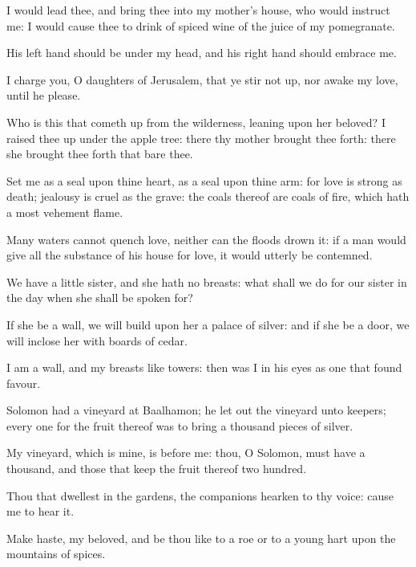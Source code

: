 I would lead thee, and bring thee into my mother's house, who would instruct me: I would cause thee to drink of spiced wine of the juice of my pomegranate.

His left hand should be under my head, and his right hand should embrace me.

I charge you, O daughters of Jerusalem, that ye stir not up, nor awake my love, until he please.

Who is this that cometh up from the wilderness, leaning upon her beloved? I raised thee up under the apple tree: there thy mother brought thee forth: there she brought thee forth that bare thee.

Set me as a seal upon thine heart, as a seal upon thine arm: for love is strong as death; jealousy is cruel as the grave: the coals thereof are coals of fire, which hath a most vehement flame.

Many waters cannot quench love, neither can the floods drown it: if a man would give all the substance of his house for love, it would utterly be contemned.

We have a little sister, and she hath no breasts: what shall we do for our sister in the day when she shall be spoken for?

If she be a wall, we will build upon her a palace of silver: and if she be a door, we will inclose her with boards of cedar.

I am a wall, and my breasts like towers: then was I in his eyes as one that found favour.

Solomon had a vineyard at Baalhamon; he let out the vineyard unto keepers; every one for the fruit thereof was to bring a thousand pieces of silver.

My vineyard, which is mine, is before me: thou, O Solomon, must have a thousand, and those that keep the fruit thereof two hundred.

Thou that dwellest in the gardens, the companions hearken to thy voice: cause me to hear it.

Make haste, my beloved, and be thou like to a roe or to a young hart upon the mountains of spices.

